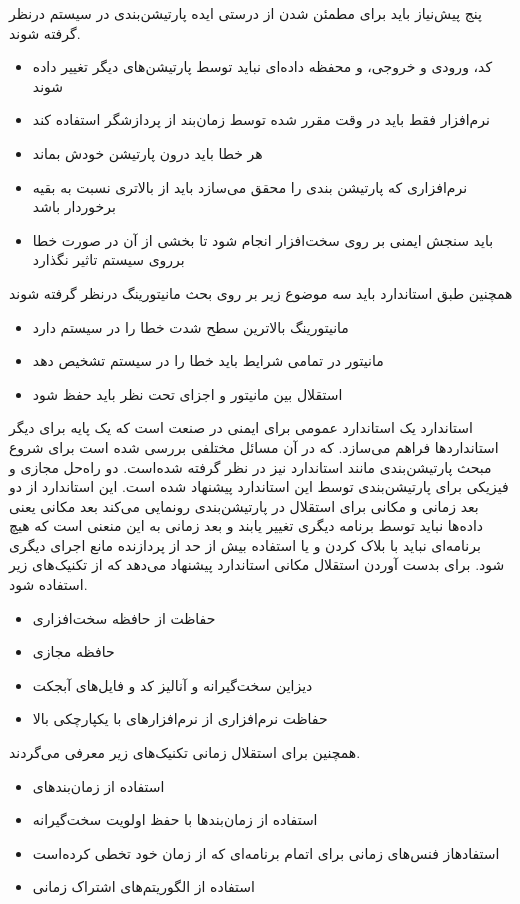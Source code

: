 \documentclass[a4paper, 12pt]{article}
\begin{document}
پنج پیش‌نیاز باید برای مطمئن شدن از درستی ایده پارتیشن‌بندی در سیستم در‌نظر گرفته شوند.
\begin{itemize}
    \item کد، ورودی و خروجی، و محفظه داده‌ای نباید توسط پارتیشن‌های دیگر تغییر داده شوند
    \item نرم‌افزار فقط باید در وقت مقرر شده توسط زمان‌بند از پردازشگر استفاده کند
    \item هر خطا باید درون پارتیشن خودش بماند
    \item نرم‌افزاری که پارتیشن بندی را محقق می‌سازد باید از
    بالاتری نسبت به بقیه برخوردار باشد
    \item باید سنجش ایمنی بر روی سخت‌افزار انجام شود تا بخشی از آن در صورت خطا بر‌روی سیستم
    تاثیر نگذارد
\end{itemize}
همچنین طبق استاندارد باید سه موضوع زیر بر روی بحث مانیتورینگ در‌نظر گرفته شوند
\begin{itemize}
    \item {}
    مانیتورینگ بالاترین سطح شدت خطا را در سیستم دارد
    \item مانیتور در تمامی شرایط باید خطا را در سیستم تشخیص دهد
    \item استقلال بین مانیتور و اجزای تحت نظر باید حفظ شود
\end{itemize}
استاندارد
یک استاندارد عمومی برای ایمنی در صنعت است که یک پایه برای دیگر استاندارد‌ها فراهم می‌سازد.
که در آن مسائل مختلفی بررسی شده است
برای شروع مبحث پارتیشن‌بندی مانند استاندارد
نیز در نظر گرفته شده‌است.
دو راه‌حل مجازی و فیزیکی برای پارتیشن‌بندی توسط این استاندارد پیشنهاد شده است.
این استاندارد از دو بعد زمانی و مکانی برای استقلال در پارتیشن‌بندی رونمایی می‌کند
بعد مکانی یعنی داده‌ها نباید توسط برنامه دیگری تغییر یابند و بعد زمانی
به این منعنی است که هیچ برنامه‌ای نباید با بلاک کردن و یا استفاده بیش از حد از پردازنده
مانع اجرای دیگری شود.
برای بدست آوردن استقلال مکانی استاندارد پیشنهاد می‌دهد که از تکنیک‌های زیر استفاده شود.
\begin{itemize}
    \item حفاظت از حافظه سخت‌افزاری\
    \item حافظه مجازی
    \item دیزاین سخت‌گیرانه و آنالیز کد و فایل‌های آبجکت
    \item حفاظت نرم‌افزاری از نرم‌افزار‌های با یکپارچکی بالا
\end{itemize}
همچنین برای استقلال زمانی تکنیک‌های زیر معرفی می‌گردند.
\begin{itemize}
    \item استفاده از زمان‌بند‌های 
    \item استفاده از زمان‌بند‌ها با حفظ اولویت سخت‌گیرانه
    \item استفادهاز فنس‌های زمانی برای اتمام برنامه‌ای که از زمان خود تخطی کرده‌است
    \item استفاده از الگوریتم‌های اشتراک زمانی
\end{itemize}
\end{document}
